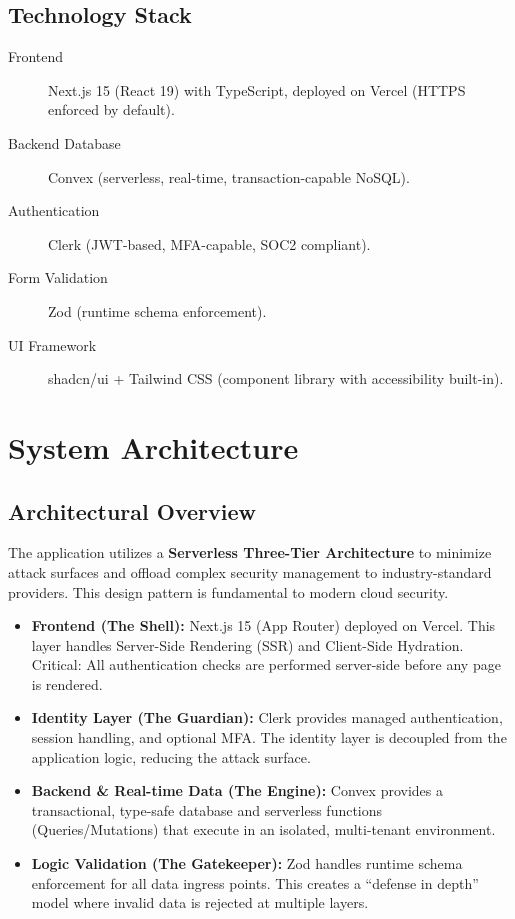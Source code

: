 \documentclass[11pt,a4paper]{article}
\begin{document}
\subsection{Technology Stack}
\begin{description}
    \item[Frontend] Next.js 15 (React 19) with TypeScript, deployed on Vercel (HTTPS enforced by default).
    \item[Backend Database] Convex (serverless, real-time, transaction-capable NoSQL).
    \item[Authentication] Clerk (JWT-based, MFA-capable, SOC2 compliant).
    \item[Form Validation] Zod (runtime schema enforcement).
    \item[UI Framework] shadcn/ui + Tailwind CSS (component library with accessibility built-in).
\end{description}

\section{System Architecture}

\subsection{Architectural Overview}
The application utilizes a \textbf{Serverless Three-Tier Architecture} to minimize attack surfaces and offload complex security management to industry-standard providers. This design pattern is fundamental to modern cloud security.

\begin{itemize}
    \item \textbf{Frontend (The Shell):} Next.js 15 (App Router) deployed on Vercel. This layer handles Server-Side Rendering (SSR) and Client-Side Hydration. Critical: All authentication checks are performed server-side before any page is rendered.
    \item \textbf{Identity Layer (The Guardian):} Clerk provides managed authentication, session handling, and optional MFA. The identity layer is decoupled from the application logic, reducing the attack surface.
    \item \textbf{Backend \& Real-time Data (The Engine):} Convex provides a transactional, type-safe database and serverless functions (Queries/Mutations) that execute in an isolated, multi-tenant environment.
    \item \textbf{Logic Validation (The Gatekeeper):} Zod handles runtime schema enforcement for all data ingress points. This creates a ``defense in depth'' model where invalid data is rejected at multiple layers.
\end{itemize}
\end{document}
